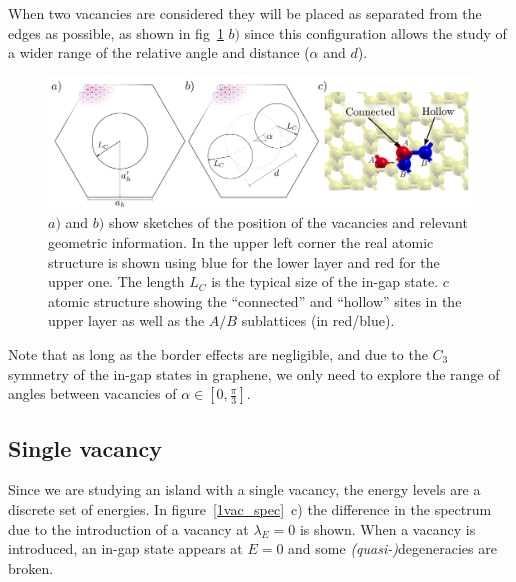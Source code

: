 When two vacancies are considered they will be placed as separated from the edges as possible, as shown in fig~\ref{geo_sketch} $b)$ since this configuration allows the study of a wider range of the relative angle and distance ($\alpha$ and $d$).
\begin{figure}[h!]
\centering
\includegraphics[width=\textwidth]{chapter06/figures/vacs_sketch.pdf}
\vspace{-15pt}
\caption{$a)$ and $b)$ show sketches of the position of the vacancies and relevant geometric information. In the upper left corner the real atomic structure is shown using blue for the lower layer and red for the upper one. The length $L_C$ is the typical size of the in-gap state. $c$ atomic structure showing the ``connected'' and ``hollow'' sites in the upper layer as well as the $A/B$ sublattices (in red/blue).}
\label{geo_sketch}
\end{figure}
\FloatBarrier

Note that as long as the border effects are negligible, and due to the $C_3$ symmetry of the in-gap states in graphene, we only need to explore the range of angles between vacancies of $\alpha\in\left[0,\tfrac{\pi}{3}\right]$.


\subsection{Single vacancy} %
Since we are studying an island with a single vacancy, the energy levels are a discrete set of energies. In figure~\ref{1vac_spec}~c) the difference in the spectrum due to the introduction of a vacancy at $\lambda_E=0$ is shown. When a vacancy is introduced, an in-gap state appears at $E=0$ and some \emph{(quasi-)}degeneracies are broken.

